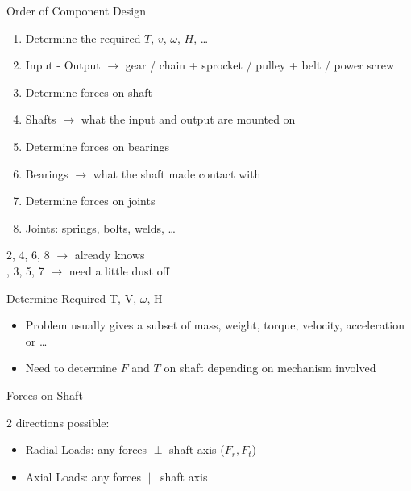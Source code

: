 \documentclass[10pt, svgnames]{beamer}
\begin{document}
\begin{frame}[label={sec:orga6096b6}]{Order of Component Design}
\begin{enumerate}
\item Determine the required \(T\), \(v\), \(\omega\), \(H\), \ldots{}
\item Input - Output \(\rightarrow\) gear / chain + sprocket / pulley + belt / power screw
\item Determine forces on shaft
\item Shafts \(\rightarrow\) what the input and output are mounted on
\item Determine forces on bearings
\item Bearings \(\rightarrow\) what the shaft made contact with
\item Determine forces on joints
\item Joints: springs, bolts, welds, \ldots{}
\end{enumerate}

2, 4, 6, 8 \(\rightarrow\) already knows \\, 3, 5, 7 \(\rightarrow\) need a little dust off
\end{frame}

\begin{frame}[label={sec:org2e83306}]{Determine Required T, V, \(\omega\), H}
\begin{itemize}
\item Problem usually gives a subset of mass, weight, torque, velocity, acceleration or \ldots{}

\item Need to determine \(F\) and \(T\) on shaft depending on mechanism involved
\end{itemize}
\end{frame}

\begin{frame}[label={sec:org19bbacf}]{Forces on Shaft}
\begin{center}
\end{center}
\normalcolor

2 directions possible:

\begin{itemize}
\item Radial Loads: any forces \(\perp\) shaft axis (\(F_{r}, F_{t}\))

\item Axial Loads: any forces \(\parallel\) shaft axis
\end{itemize}
\end{frame}
\end{document}
